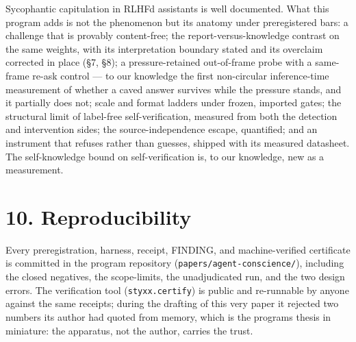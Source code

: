 \documentclass[11pt]{article}
\begin{document}
Sycophantic capitulation in RLHF\textquotesingle d assistants is well documented. What this program adds is not the phenomenon but its anatomy under preregistered bars: a challenge that is provably content-free; the report-versus-knowledge contrast on the same weights, with its interpretation boundary stated and its overclaim corrected in place (§7, §8); a pressure-retained out-of-frame probe with a same-frame re-ask control --- to our knowledge the first non-circular inference-time measurement of whether a caved answer survives while the pressure stands, and it partially does not; scale and format ladders under frozen, imported gates; the structural limit of label-free self-verification, measured from both the detection and intervention sides; the source-independence escape, quantified; and an instrument that refuses rather than guesses, shipped with its measured datasheet. The self-knowledge bound on self-verification is, to our knowledge, new as a measurement.

\section{10. Reproducibility}\label{10-reproducibility}

Every preregistration, harness, receipt, FINDING, and machine-verified certificate is committed in the program repository (\texttt{papers/agent-conscience/}), including the closed negatives, the scope-limits, the unadjudicated run, and the two design errors. The verification tool (\texttt{styxx.certify}) is public and re-runnable by anyone against the same receipts; during the drafting of this very paper it rejected two numbers its author had quoted from memory, which is the program\textquotesingle s thesis in miniature: the apparatus, not the author, carries the trust.
\end{document}
